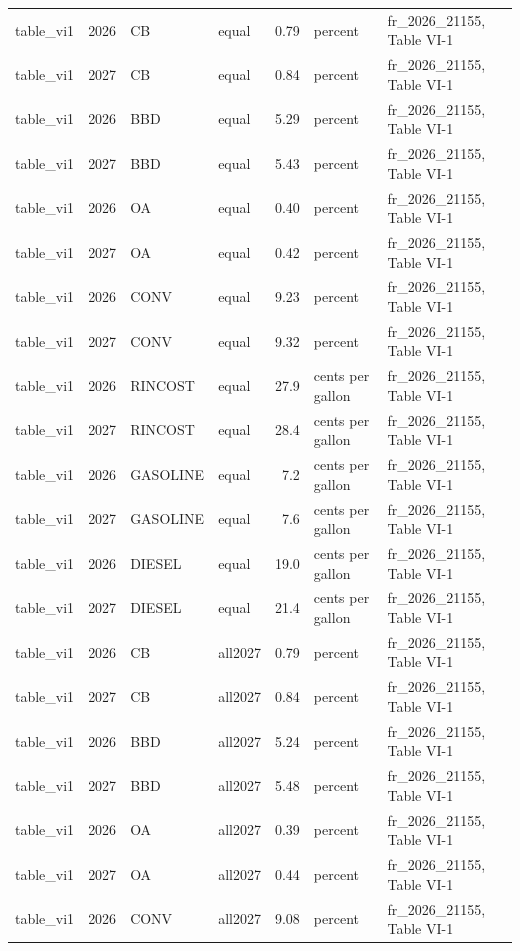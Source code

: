 \begin{longtable}{p{2.3cm}p{0.7cm}p{1.0cm}p{2.6cm}rp{1.7cm}p{4.6cm}}
table\_vi1 & 2026 & CB & equal & 0.79 & percent & fr\_2026\_21155, Table VI-1 \\
table\_vi1 & 2027 & CB & equal & 0.84 & percent & fr\_2026\_21155, Table VI-1 \\
table\_vi1 & 2026 & BBD & equal & 5.29 & percent & fr\_2026\_21155, Table VI-1 \\
table\_vi1 & 2027 & BBD & equal & 5.43 & percent & fr\_2026\_21155, Table VI-1 \\
table\_vi1 & 2026 & OA & equal & 0.40 & percent & fr\_2026\_21155, Table VI-1 \\
table\_vi1 & 2027 & OA & equal & 0.42 & percent & fr\_2026\_21155, Table VI-1 \\
table\_vi1 & 2026 & CONV & equal & 9.23 & percent & fr\_2026\_21155, Table VI-1 \\
table\_vi1 & 2027 & CONV & equal & 9.32 & percent & fr\_2026\_21155, Table VI-1 \\
table\_vi1 & 2026 & RINCOST & equal & 27.9 & cents per gallon & fr\_2026\_21155, Table VI-1 \\
table\_vi1 & 2027 & RINCOST & equal & 28.4 & cents per gallon & fr\_2026\_21155, Table VI-1 \\
table\_vi1 & 2026 & GASOLINE & equal & 7.2 & cents per gallon & fr\_2026\_21155, Table VI-1 \\
table\_vi1 & 2027 & GASOLINE & equal & 7.6 & cents per gallon & fr\_2026\_21155, Table VI-1 \\
table\_vi1 & 2026 & DIESEL & equal & 19.0 & cents per gallon & fr\_2026\_21155, Table VI-1 \\
table\_vi1 & 2027 & DIESEL & equal & 21.4 & cents per gallon & fr\_2026\_21155, Table VI-1 \\
table\_vi1 & 2026 & CB & all2027 & 0.79 & percent & fr\_2026\_21155, Table VI-1 \\
table\_vi1 & 2027 & CB & all2027 & 0.84 & percent & fr\_2026\_21155, Table VI-1 \\
table\_vi1 & 2026 & BBD & all2027 & 5.24 & percent & fr\_2026\_21155, Table VI-1 \\
table\_vi1 & 2027 & BBD & all2027 & 5.48 & percent & fr\_2026\_21155, Table VI-1 \\
table\_vi1 & 2026 & OA & all2027 & 0.39 & percent & fr\_2026\_21155, Table VI-1 \\
table\_vi1 & 2027 & OA & all2027 & 0.44 & percent & fr\_2026\_21155, Table VI-1 \\
table\_vi1 & 2026 & CONV & all2027 & 9.08 & percent & fr\_2026\_21155, Table VI-1 \\

\end{longtable}
